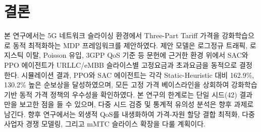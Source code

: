 \documentclass[10pt, twocolumn]{article}
\begin{document}
\section{결론}

본 연구에서는 5G 네트워크 슬라이싱 환경에서 Three-Part Tariff 가격을 강화학습으로 동적 최적화하는 MDP 프레임워크를 제안하였다.
제안 모델은 로그정규 트래픽, 로지스틱 이탈, Poisson 유입, 3GPP QoS 기준 등 문헌에 근거한 환경 위에서 SAC와 PPO 에이전트가 URLLC/eMBB 슬라이스별 고정요금과 초과요금을 동적으로 결정한다.
시뮬레이션 결과, PPO와 SAC 에이전트는 각각 Static-Heuristic 대비 162.9\%, 130.2\% 높은 순보상을 달성하였으며, 모든 고정 가격 베이스라인을 상회하여 강화학습 기반 동적 가격 정책의 우수성을 확인하였다.
본 연구의 한계로는 단일 시드(42) 결과만을 보고한 점을 들 수 있으며, 다중 시드 검증 및 통계적 유의성 분석은 향후 과제로 남긴다.
향후 연구에서는 외생적 QoS를 내생화하여 가격-자원 할당 결합 최적화, 다중 사업자 경쟁 모델링, 그리고 mMTC 슬라이스 확장을 다룰 계획이다.

\end{document}
